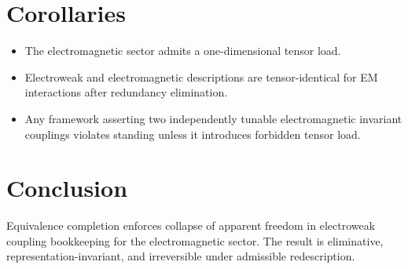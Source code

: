 ﻿\documentclass[11pt]{article}
\begin{document}
\section{Corollaries}
\begin{itemize}
\item The electromagnetic sector admits a one-dimensional tensor load.
\item Electroweak and electromagnetic descriptions are tensor-identical for EM interactions after redundancy elimination.
\item Any framework asserting two independently tunable electromagnetic invariant couplings violates standing unless it introduces forbidden tensor load.
\end{itemize}

\section*{Conclusion}
Equivalence completion enforces collapse of apparent freedom in electroweak coupling bookkeeping for the electromagnetic sector. The result is eliminative, representation-invariant, and irreversible under admissible redescription.
\end{document}
